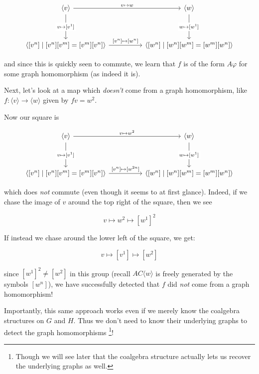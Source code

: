 \documentclass[microtype]{gtpart}
\theoremstyle{definition}
\theoremstyle{theorem}
\begin{document}
\setlength\mathsurround{0pt}
\[
  \begin{tikzcd}
    {\langle v \rangle} && {\langle w \rangle} \\
    \\
    {\left \langle [v^n] \mid [v^n][v^m] = [v^m][v^n] \right \rangle} 
    && 
    {\left \langle [w^n] \mid [w^n][w^m] = [w^m][w^n] \right \rangle}
    \arrow["{v \mapsto w}", from=1-1, to=1-3]
    \arrow["{[v^n] \mapsto [w^n]}", from=3-1, to=3-3]
    \arrow["{v \mapsto [v^1]}"{description}, from=1-1, to=3-1]
    \arrow["{w \mapsto [w^1]}"{description}, from=1-3, to=3-3]
  \end{tikzcd}
\]
\setlength\mathsurround{0.8pt}

and since this is quickly seen to commute, we learn that $f$ is of the form 
$A \varphi$ for some graph homomorphism (as indeed it is).

\bigskip

Next, let's look at a map which \emph{doesn't} come from a graph homomorphism,
like $f : \langle v \rangle \to \langle w \rangle$ given by $fv = w^2$.

Now our square is

\setlength\mathsurround{0pt}
\[\begin{tikzcd}
	{\langle v \rangle} && {\langle w \rangle} \\
	\\
  {\langle [v^n] \mid [v^n][v^m] = [v^m][v^n] \rangle} 
  && 
  {\langle [w^n] \mid [w^n][w^m] = [w^m][w^n] \rangle}
	\arrow["{v \mapsto w^2}", from=1-1, to=1-3]
  \arrow["{[v^n] \mapsto [w^{2n}]}", from=3-1, to=3-3]
	\arrow["{v \mapsto [v^1]}"{description}, from=1-1, to=3-1]
	\arrow["{w \mapsto [w^1]}"{description}, from=1-3, to=3-3]
\end{tikzcd}\]
\setlength\mathsurround{0.8pt}

which does \emph{not} commute (even though it seems to at first glance). 
Indeed, if we chase the image of $v$ around the top right of the square, then 
we see

\[ v \mapsto w^2 \mapsto [w^1]^2 \]

If instead we chase around the lower left of the square, we get:

\[ v \mapsto [v^1] \mapsto [w^2] \]

since $[w^1]^2 \neq [w^2]$ in this group (recall $AC \langle w \rangle$ is 
freely generated by the symbols $[w^n]$), we have successfully detected that 
$f$ did \emph{not} come from a graph homomorphism!

Importantly, this same approach works even if we merely know the 
coalgebra structures on $G$ and $H$. Thus we don't need to know their
underlying graphs to detect the graph homomorphisms%
\footnote{Though we will see later that the coalgebra structure 
actually lets us recover the underlying graphs as well.}! 
\end{document}
